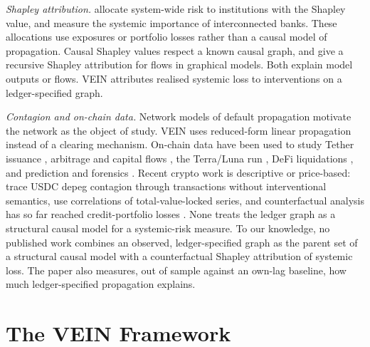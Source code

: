 \documentclass[referee,pdflatex,sn-mathphys-ay]{sn-jnl}
\theoremstyle{thmstyleone}%
\theoremstyle{thmstyletwo}%
\theoremstyle{thmstylethree}%
\begin{document}
\emph{Shapley attribution.} \citet{tarashev2016attributing}
allocate system-wide risk to institutions with the Shapley value, and
\citet{drehmann2013measuring} measure the systemic importance of interconnected banks.
These allocations use exposures or portfolio losses rather than a causal model of
propagation. Causal Shapley values \citep{heskes2020causal} respect a known causal graph,
and \citet{singal2021flow} give a recursive Shapley attribution for flows in graphical
models. Both explain model outputs or flows. VEIN attributes realised systemic loss to
interventions on a ledger-specified graph.

\emph{Contagion and on-chain data.} Network models of default propagation
\citep{eisenberg2001systemic,acemoglu2015systemic,glasserman2016contagion} motivate the
network as the object of study. VEIN uses reduced-form linear propagation instead of a
clearing mechanism. On-chain data have been used to study Tether issuance \citep{griffin2020bitcoin}, arbitrage
and capital flows \citep{makarov2020trading}, the Terra/Luna run \citep{liu2023anatomy},
DeFi liquidations \citep{qin2021liquidations}, and prediction and forensics
\citep{akcora2018bitcoin,meiklejohn2013fistful,weber2019antimoney}. Recent crypto work is descriptive or price-based:
\citet{sankaewtong2026tracing} trace USDC depeg contagion through transactions without interventional semantics,
\citet{zhang2026defi} use correlations of total-value-locked series, and counterfactual analysis has so far reached
credit-portfolio losses \citep{xu2025counterfactual}. None treats the ledger graph as a structural causal model for a
systemic-risk measure. To our knowledge, no published work combines an observed, ledger-specified graph as the parent set of a
structural causal model with a counterfactual Shapley attribution of systemic loss. The paper also measures, out of
sample against an own-lag baseline, how much ledger-specified propagation explains.

\section{The VEIN Framework}
\label{sec:method}
\end{document}
